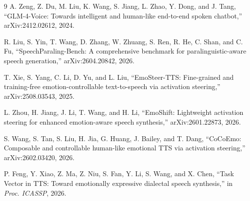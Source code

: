 \documentclass{article}
\begin{document}

\clearpage
\begin{thebibliography}{9}
A. Zeng, Z. Du, M. Liu, K. Wang, S. Jiang, L. Zhao, Y. Dong, and J. Tang,
``GLM-4-Voice: Towards intelligent and human-like end-to-end spoken chatbot,''
arXiv:2412.02612, 2024.

R. Liu, S. Yin, T. Wang, D. Zhang, W. Zhuang, S. Ren, R. He, C. Shan, and C. Fu,
``SpeechParaling-Bench: A comprehensive benchmark for paralinguistic-aware speech generation,''
arXiv:2604.20842, 2026.

T. Xie, S. Yang, C. Li, D. Yu, and L. Liu,
``EmoSteer-TTS: Fine-grained and training-free emotion-controllable text-to-speech via activation steering,''
arXiv:2508.03543, 2025.

L. Zhou, H. Jiang, J. Li, T. Wang, and H. Li,
``EmoShift: Lightweight activation steering for enhanced emotion-aware speech synthesis,''
arXiv:2601.22873, 2026.

S. Wang, S. Tan, S. Liu, H. Jia, G. Huang, J. Bailey, and T. Dang,
``CoCoEmo: Composable and controllable human-like emotional TTS via activation steering,''
arXiv:2602.03420, 2026.

P. Feng, Y. Xiao, Z. Ma, Z. Niu, S. Fan, Y. Li, S. Wang, and X. Chen,
``Task Vector in TTS: Toward emotionally expressive dialectal speech synthesis,''
in \emph{Proc. ICASSP}, 2026.
\end{thebibliography}
\end{document}
